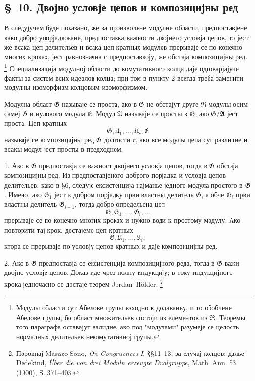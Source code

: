 \documentclass[11pt]{article}
\providecommand{\mR}{\mathfrak{R}}
\providecommand{\mG}{\mathfrak{G}}
\providecommand{\mU}{\mathfrak{U}}
\providecommand{\mE}{\mathfrak{E}}
\providecommand{\mA}{\mathfrak{A}}
\begin{document}
\setcounter{footnote}{32}

\subsection*{\S~10. Двојно условје цепов и композицијны ред}

В следујучем буде показано, же за произвольне модулне области, предпоставјене како добро упорјадковане, предпоставка важности двојнего условја цепов, то јест же всака цеп делительев и всака цеп кратных модулов прерываје се по конечно многих кроках, јест равнозначна с предпоставкоју, же обстаја композицијны ред.
\footnote{Модулы области сут Абелове групы взходно к додаваньу, и то обобчене Абелове групы, бо област множительев состоји из елементов из $\mR$. Теоремы того параграфа оставајут валидне, ако под "модулами" разумеје се целость нормалных делительев некомутативној групы.}
Специализација модулној области до комутативного колца даје одговарјајуче факты за систем всих идеалов колца; при том в пункту 2 всегда треба заменити модулны изоморфизм колцовым изоморфизмом.

Модулна област $\mG$ называје се проста, ако в $\mG$ не обстајут друге $\mR$-модулы осим самеј $\mG$ и нулового модула $\mE$. Модул $\mA$ называје се просты в $\mG$, ако $\mG/\mA$ јест проста. Цеп кратных
\[
        \mG,\mU_1,\ldots,\mU_r,\mE
\]
называје се композицијны ред $\mG$ долгости $r$, ако все модулы цепа сут различне и всакы модул јест просты в предходном.

1. Ако в $\mG$ предпоставја се важност двојнего условја цепов, тогда в $\mG$ обстаја композицијны ред. Из предпоставјеного доброго порјадка и условја цепов делительев, како в §6, следује ексистенција најманье једного модула простого в $\mG$. Имено, ако $\mG_1$ јест в добром порјадку први властны делитель $\mG$, а обче $\mG_i$ први властны делитель $\mG_{i-1}$, тогда добро определьена цеп
\[
        \mG,\mG_1,\ldots,\mG_i,\ldots
\]
прерываје се по конечно многих кроках и нужно води к простому модулу. Ако повторити тај крок, достајемо цеп кратных
\[
        \mG,\mU_1,\ldots,\mU_i,
\]
ктора се прерываје по условју цепов кратных и даје композицијны ред.

2. Ако в $\mG$ предпоставја се ексистенција композицијного реда, тогда в $\mG$ важи двојно условје цепов. Доказ иде чрез полну индукцију; в току индукцијного крока једночасно се достаје теорем Jordan--Hölder.
\footnote{Поровнај Masazo Sono, \emph{On Congruences I}, §§11--13, за случај колцов; далье Dedekind, \emph{Über die von drei Moduln erzeugte Dualgruppe}, Math. Ann. 53 (1900), S. 371--403.}
\end{document}
